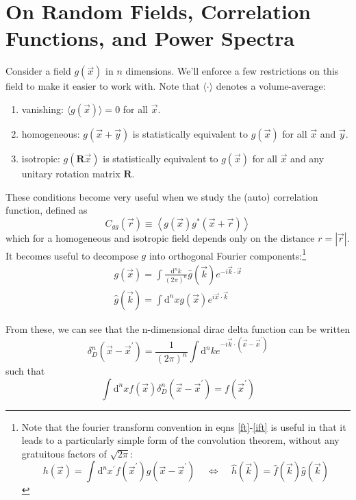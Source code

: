 \documentclass[12pt,preprint]{aastex}			%
\newcommand{\dd}{\mathrm{d}}
\begin{document}


\section{On Random Fields, Correlation Functions, and Power Spectra}
Consider a field $g(\vec x)$ in $n$ dimensions. We'll enforce a 
few restrictions on this field to make it easier to work with.
Note that $\langle\cdot\rangle$ denotes a volume-average:
\begin{enumerate}
  \item vanishing: $\langle g(\vec x)\rangle=0$ 
    for all $\vec x$.
  \item homogeneous: $g(\vec x + \vec y)$ is statistically equivalent to
    $g(\vec x)$ for all $\vec x$ and $\vec y$.
  \item isotropic: $g(\mathbf{R}\vec x)$ is statistically equivalent to
    $g(\vec x)$ for all $\vec x$ and any unitary rotation matrix $\mathbf{R}$.
\end{enumerate}
These conditions become very useful when we study the 
(auto) correlation function, defined as
\begin{equation}
  \label{Cgg}
  C_{gg}(\vec r) \equiv \left\langle g(\vec x) g^*(\vec x+\vec{r})\right\rangle
\end{equation}
which for a homogeneous and isotropic field depends only on the 
distance $r = |\vec r|$.  It becomes useful to decompose $g$ into
orthogonal Fourier components:\footnote{
  Note that the fourier transform convention in eqns \ref{ft}-\ref{ift}
  is useful in that it leads to a particularly simple form of the 
  convolution theorem, without any gratuitous factors of $\sqrt{2\pi}$:
  \begin{displaymath}
    h(\vec x) = \int\dd^nx^\prime 
    f(\vec x^\prime)g(\vec x-\vec x^\prime)
    \ \ \ \ \ \Longleftrightarrow\ \ \ \ \ 
    \hat h(\vec k) = \hat f(\vec k)\hat g(\vec k)
  \end{displaymath}
}
\begin{eqnarray}
  \label{ft}
  g(\vec x) = \int \frac{\dd^nk}{(2\pi)^n} \hat{g}(\vec k)
  e^{-i\vec k\cdot\vec x}\\
  \label{ift}
  \hat{g}(\vec k) = \int \dd^nx g(\vec x)e^{i\vec x\cdot\vec k}
\end{eqnarray}

From these, we can see that the n-dimensional dirac delta 
function can be written
\begin{equation}
  \label{ddelta_form}
  \delta^n_D(\vec x-\vec x^\prime) = \frac{1}{(2\pi)^n}\int \dd^nke^{-i\vec k\cdot(\vec x-\vec x^\prime)}
\end{equation}
such that 
\begin{equation}
  \label{ddelta_def}
  \int \dd^nx f(\vec x)\delta^n_D(\vec x-\vec x^\prime) = f(\vec x^\prime)
\end{equation}
\end{document}
